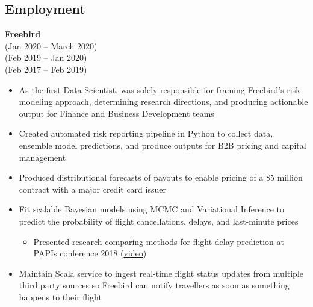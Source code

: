 \documentclass{res}
\begin{document}
 
\setlength{\parskip}{10pt}
\renewcommand{\labelitemi}{\scriptsize$\bullet$} 

\address{\hspace{2pt}} %
\address{\href{http://maxlivingston.org}{maxlivingston.org}}

\begin{resume} 
  \section{Employment}
  {\bf Freebird} \\ 
   \hspace{3pt} (Jan 2020 -- March 2020) \\
   \hspace{17pt} (Feb 2019 -- Jan 2020) \\
   \hspace{49pt} (Feb 2017 -- Feb 2019)
  \begin{itemize} \itemsep 2.0pt \parskip 2.0pt %
    \item As the first Data Scientist, was solely responsible for framing Freebird's risk modeling approach, determining research directions, and producing actionable output for Finance and Business Development teams
    \item Created automated risk reporting pipeline in Python to collect data, ensemble model predictions, and produce outputs for B2B pricing and capital management
    \item Produced distributional forecasts of payouts to enable pricing of a \$5 million contract with a major credit card issuer
    \item Fit scalable Bayesian models using MCMC and Variational Inference to predict the probability of flight cancellations, delays, and last-minute prices
    \setlength{\parskip}{-2pt} 
    \begin{itemize}
      \setlength{\itemsep}{1.0pt}
    \item Presented research comparing methods for flight delay prediction at PAPIs conference 2018 (\href{https://www.infoq.com/presentations/flight-bayesian-prediction}{video})
    \end{itemize}
    \setlength{\parskip}{2.0pt} 
  \item Maintain Scala service to ingest real-time flight status updates from multiple third party sources so Freebird can notify travellers as soon as something happens to their flight
  \end{itemize}


\end{resume}
\end{document}
